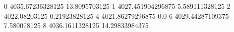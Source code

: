 0 4035.67236328125 13.8095703125
1 4027.451904296875 5.589111328125
2 4022.08203125 0.21923828125
4 4021.86279296875 0.0
6 4029.44287109375 7.580078125
8 4036.1611328125 14.29833984375
